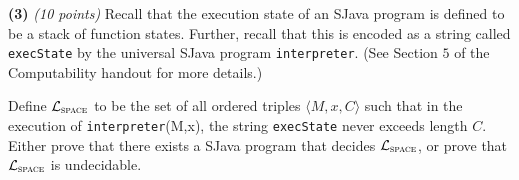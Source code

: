 \documentclass[12pt]{article}
\newcommand{\sjava}{{\sc SJava}\xspace}
\newcommand{\lsub}[1]{\mathcal{L}_{\textsc{#1}}}
\def\bigap{0.25in}
\begin{document}
\setlength{\parindent}{0in}
\addtolength{\parskip}{0.1cm}
\setlength{\fboxrule}{.5mm}\setlength{\fboxsep}{1.2mm}
\newlength{\boxlength}\setlength{\boxlength}{\textwidth}
\addtolength{\boxlength}{-4mm}
\begin{center}
\end{center}
\vspace{5mm}
\vskip \bigap
{\bf (3)} {\em (10 points)} Recall that the execution state of an \sjava program is defined to be a stack of function states. Further, recall that this is encoded as a string called \texttt{execState} by the universal \sjava program \texttt{interpreter}. (See Section $5$ of the Computability handout for more details.)

Define $\lsub{space}$ to be the set of all ordered triples $\langle M, x, C \rangle$ such that in the execution of \texttt{interpreter}(M,x), the string \texttt{execState} never exceeds length $C$. Either prove that there exists a \sjava program that decides $\lsub{space}$, or prove that $\lsub{space}$ is undecidable.


\end{document}
